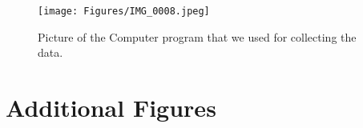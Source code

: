 \begin{figure}[htpb]
    \centering
    \texttt{[image: Figures/IMG\_0008.jpeg]}
    \caption[Picture of the Computer program that we used for collecting the data.]{Picture of the Computer program that we used for collecting the data.}
    \label{fig: DataCollectionTool}
\end{figure}

\newpage

\section{Additional Figures} \label{sec:additional_figures}

%     
